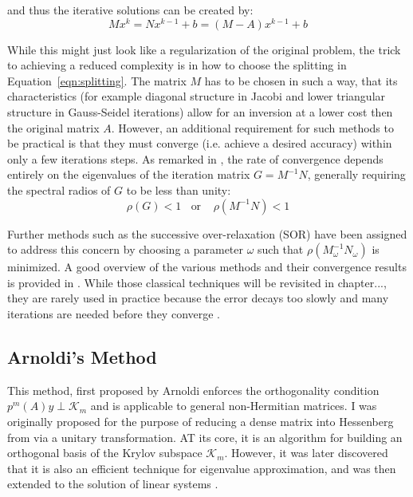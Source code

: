 \noindent and thus the iterative solutions can be created by:
\begin{equation}
    Mx^k = Nx^{k-1} +b = (M-A)x^{k-1}+b
\end{equation}

\noindent While this might just look like a regularization of the original problem, the trick to achieving a reduced complexity is in how to choose the splitting in Equation~\hyperref[eqn:splitting]{\ref{eqn:splitting}}. The matrix $M$ has to be chosen in such a way, that its characteristics (for example diagonal structure in Jacobi and lower triangular structure in Gauss-Seidel iterations) allow for an inversion at a lower cost then the original matrix $A$. However, an additional requirement for such methods to be practical is that they must converge (i.e. achieve a desired accuracy) within only a few iterations steps. As remarked in \cite{golub_matrix_2013}, the rate of convergence depends entirely on the eigenvalues of the iteration matrix $G=M^{-1}N$, generally requiring the spectral radios of $G$ to be less than unity:
\begin{equation}
    \rho(G) < 1 \;\;\text{ or }\;\;\ \rho(M^{-1}N)<1
\end{equation}

\noindent Further methods such as the successive over-relaxation (SOR) have been assigned to address this concern by choosing a parameter $\omega$ such that $\rho(M_\omega^{-1}N_\omega)$ is minimized. A good overview of the various methods and their convergence results is provided in \cite{saad_iterative_2003}. 
While those classical techniques will be revisited in chapter..., they are rarely used in practice because the error decays too slowly and many iterations are needed before they converge \cite{strang_introduction_2009}.




\subsection{Arnoldi's Method}
\label{sec:arnoldi}
This method, first proposed by Arnoldi \cite{arnoldi_principle_1951} enforces the orthogonality condition $p^m(A)y \perp \mathcal{K}_m$ and is applicable to general non-Hermitian matrices. I was originally proposed for the purpose of reducing a dense matrix into Hessenberg from via a unitary transformation. AT its core, it is an algorithm for building an orthogonal basis of the Krylov subspace $\mathcal{K}_m$. However, it was later discovered that it is also an efficient technique for eigenvalue approximation, and was then extended to the solution of linear systems \cite{saad_iterative_2003}. 

